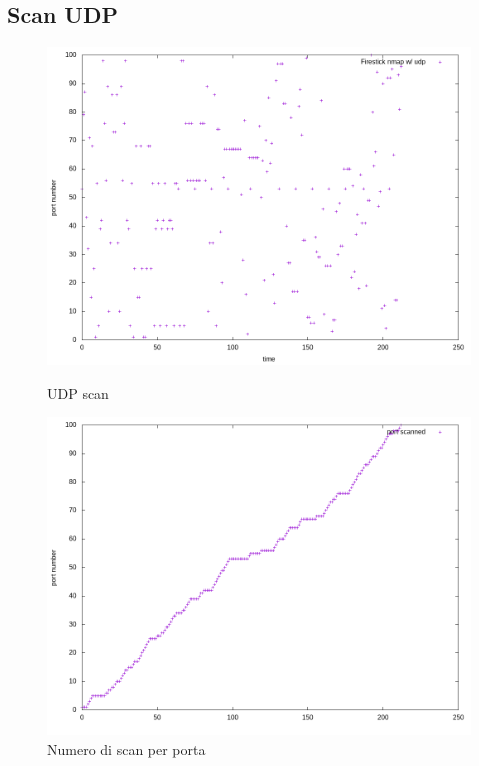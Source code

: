 \documentclass{article}
\begin{document}
\subsection{Scan UDP}
\begin{figure}[!htb]
  \begin{minipage}{0.49\textwidth}
    \centering
    \includegraphics[width=1\linewidth]{Firestick_udp.png}
    \vspace{-10pt}
    \caption{UDP scan}\label{Fig:tcp4}
  \end{minipage}\hfill
  \begin{minipage}{0.49\textwidth}
    \centering
    \includegraphics[width=1\textwidth]{Firestick_udp_num_test.png}
    \vspace{-10pt}
    \caption{Numero di scan per porta}\label{Fig:scan}
    
  \end{minipage}
\end{figure}
\end{document}
